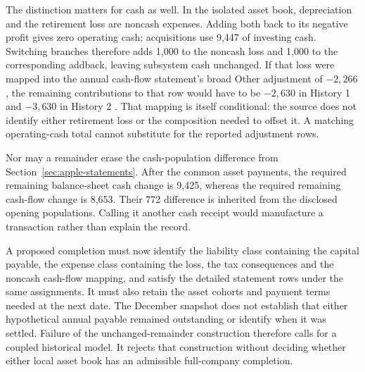The distinction matters for cash as well. In the isolated asset book,
depreciation and the retirement loss are noncash expenses. Adding both back
to its negative profit gives zero operating cash; acquisitions use 9,447 of
investing cash. Switching branches therefore adds 1,000 to the noncash loss
and 1,000 to the corresponding addback, leaving subsystem cash unchanged.
If that loss were mapped into the annual cash-flow statement's broad Other
adjustment of $-2{,}266$, the remaining contributions to that row would have
to be $-2{,}630$ in History 1 and $-3{,}630$ in History 2
\citep[printed p.~33]{apple2024}. That mapping is itself conditional: the
source does not identify either retirement loss or the composition needed
to offset it. A matching operating-cash total cannot substitute for the
reported adjustment rows.

Nor may a remainder erase the cash-population difference from
Section~\ref{sec:apple-statements}. After the common asset payments, the
required remaining balance-sheet cash change is 9,425, whereas the required
remaining cash-flow change is 8,653. Their 772 difference is inherited from
the disclosed opening populations. Calling it another cash receipt would
manufacture a transaction rather than explain the record.

A proposed completion must now identify the liability class containing the
capital payable, the expense class containing the loss, the tax consequences
and the noncash cash-flow mapping, and satisfy the detailed statement rows
under the same assignments. It must also retain the asset cohorts and payment
terms needed at the next date. The December snapshot does not establish that
either hypothetical annual payable remained outstanding or identify when it
was settled. Failure of the unchanged-remainder construction therefore calls
for a coupled historical model. It rejects that construction without deciding
whether either local asset book has an admissible full-company completion.
